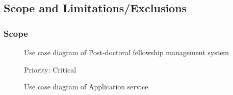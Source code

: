\documentclass[12pt]{article}
\begin{document}
\subsection{Scope and Limitations/Exclusions} %
\vspace{0.2in}


\subsubsection{Scope}
\vspace{0.2in}

\begin{figure}[H]
\centering	
{}
\caption{Use case diagram of Post-doctoral fellowship management system}
\end{figure}

\begin{figure}[H]
\centering	
{}
\caption{Use case diagram of Application service}
Priority: Critical
\end{figure}
\end{document}
